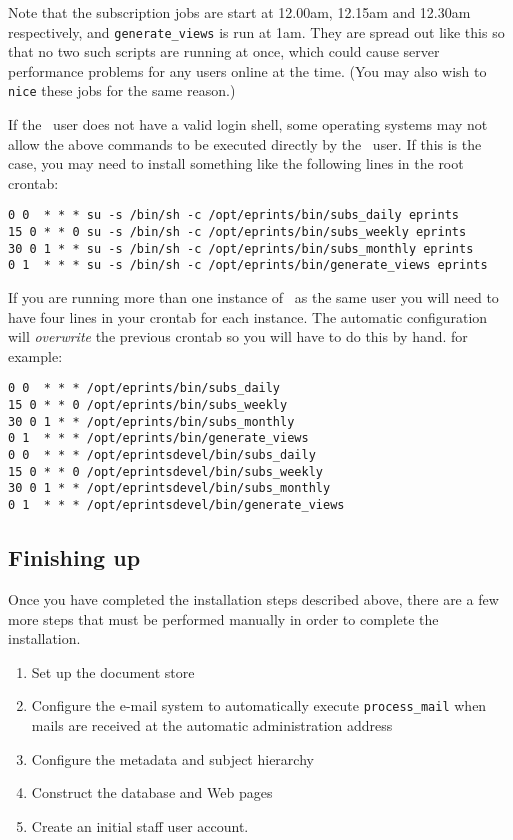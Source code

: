 Note that the subscription jobs are start at 12.00am, 12.15am and 12.30am respectively, and {\tt generate\_views} is run at 1am. They are spread out like this so that no two such scripts are running at once, which could cause server performance problems for any users online at the time. (You may also wish to {\tt nice} these jobs for the same reason.)

If the \eprints\ user does not have a valid login shell, some operating systems may not allow the above commands to be executed directly by the \eprints\ user. If this is the case, you may need to install something like the following lines in the root crontab:

\begin{verbatim}
0 0  * * * su -s /bin/sh -c /opt/eprints/bin/subs_daily eprints
15 0 * * 0 su -s /bin/sh -c /opt/eprints/bin/subs_weekly eprints
30 0 1 * * su -s /bin/sh -c /opt/eprints/bin/subs_monthly eprints
0 1  * * * su -s /bin/sh -c /opt/eprints/bin/generate_views eprints
\end{verbatim}

If you are running more than one instance of \eprints\ as the same user you will need to 
have four lines in your crontab for each instance. The automatic configuration will
{\em overwrite} the previous crontab so you will have to do this by hand. for example:

\begin{verbatim}
0 0  * * * /opt/eprints/bin/subs_daily
15 0 * * 0 /opt/eprints/bin/subs_weekly
30 0 1 * * /opt/eprints/bin/subs_monthly
0 1  * * * /opt/eprints/bin/generate_views
0 0  * * * /opt/eprintsdevel/bin/subs_daily
15 0 * * 0 /opt/eprintsdevel/bin/subs_weekly
30 0 1 * * /opt/eprintsdevel/bin/subs_monthly
0 1  * * * /opt/eprintsdevel/bin/generate_views
\end{verbatim}

\subsection{Finishing up}
\label{finishing_up}

Once you have completed the installation steps described above, there are a few more steps that must be performed manually in order to complete the installation.

\begin{enumerate}
\item Set up the document store
\item Configure the e-mail system to automatically execute {\tt process\_mail} when mails are received at the automatic administration address
\item Configure the metadata and subject hierarchy
\item Construct the database and Web pages
\item Create an initial staff user account.
\end{enumerate}

